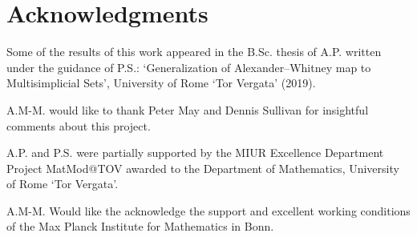 
\section*{Acknowledgments}

Some of the results of this work appeared in the B.Sc. thesis of A.P. written under the guidance of P.S.: `Generalization of Alexander--Whitney map to Multisimplicial Sets', University of Rome `Tor Vergata' (2019).

A.M-M. would like to thank Peter May and Dennis Sullivan for insightful comments about this project.

A.P. and P.S. were partially supported by the MIUR Excellence Department Project MatMod@TOV awarded to the Department of Mathematics, University of Rome `Tor Vergata'.

A.M-M. Would like the acknowledge the support and excellent working conditions of the Max Planck Institute for Mathematics in Bonn.